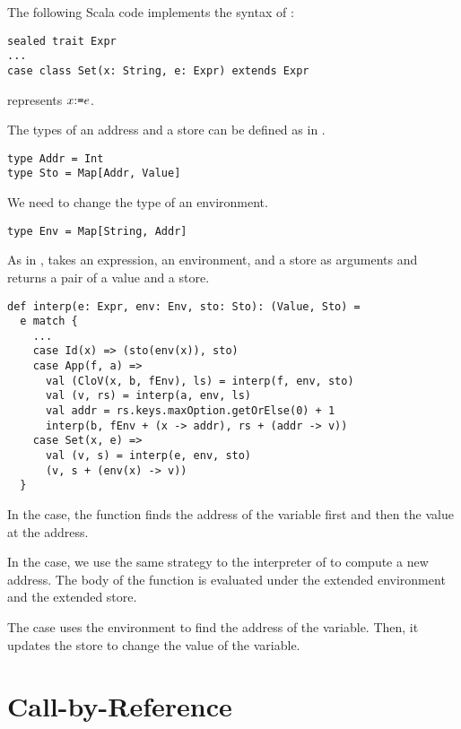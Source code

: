 The following Scala code implements the syntax of \lang:

\begin{verbatim}
sealed trait Expr
...
case class Set(x: String, e: Expr) extends Expr
\end{verbatim}

 represents $x{:}\texttt{=} e$.

The types of an address and a store can be defined as in \bfae.

\begin{verbatim}
type Addr = Int
type Sto = Map[Addr, Value]
\end{verbatim}

We need to change the type of an environment.

\begin{verbatim}
type Env = Map[String, Addr]
\end{verbatim}

As in \bfae,  takes an expression, an environment, and a store as
arguments and returns a pair of a value and a store.

\begin{verbatim}
def interp(e: Expr, env: Env, sto: Sto): (Value, Sto) =
  e match {
    ...
    case Id(x) => (sto(env(x)), sto)
    case App(f, a) =>
      val (CloV(x, b, fEnv), ls) = interp(f, env, sto)
      val (v, rs) = interp(a, env, ls)
      val addr = rs.keys.maxOption.getOrElse(0) + 1
      interp(b, fEnv + (x -> addr), rs + (addr -> v))
    case Set(x, e) =>
      val (v, s) = interp(e, env, sto)
      (v, s + (env(x) -> v))
  }
\end{verbatim}

In the  case, the function finds the address of the variable first and
then the value at the address.

In the  case, we use the same strategy to
the interpreter of \bfae to compute a new address. The body of the function is
evaluated under the extended environment and the extended store.

The  case uses the environment to find the address of the variable.
Then, it updates the store to change the value of the variable.

\section{Call-by-Reference}

